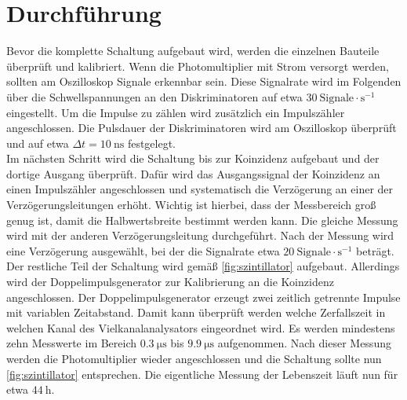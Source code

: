 \section{Durchführung}
\label{sec:Durchführung}

Bevor die komplette Schaltung aufgebaut wird, werden die einzelnen Bauteile überprüft und kalibriert.
Wenn die Photomultiplier mit Strom versorgt werden, sollten am Oszilloskop Signale erkennbar sein.
Diese Signalrate wird im Folgenden über die Schwellspannungen an den Diskriminatoren auf etwa $\qty{30}{\text{Signale}\cdot \second^{-1}}$ eingestellt.
Um die Impulse zu zählen wird zusätzlich ein Impulszähler angeschlossen.
Die Pulsdauer der Diskriminatoren wird am Oszilloskop überprüft und auf etwa $\Delta t = \qty{10}{\nano\second}$ festgelegt.
\\
Im nächsten Schritt wird die Schaltung bis zur Koinzidenz aufgebaut und der dortige Ausgang überprüft.
Dafür wird das Ausgangssignal der Koinzidenz an einen Impulszähler angeschlossen und systematisch die Verzögerung an einer der Verzögerungsleitungen erhöht.
Wichtig ist hierbei, dass der Messbereich groß genug ist, damit die Halbwertsbreite bestimmt werden kann.
Die gleiche Messung wird mit der anderen Verzögerungsleitung durchgeführt.
Nach der Messung wird eine Verzögerung ausgewählt, bei der die Signalrate etwa $\qty{20}{\text{Signale}\cdot \second^{-1}}$ beträgt.
\\
Der restliche Teil der Schaltung wird gemäß \autoref{fig:szintillator} aufgebaut.
Allerdings wird der Doppelimpulsgenerator zur Kalibrierung an die Koinzidenz angeschlossen.
Der Doppelimpulsgenerator erzeugt zwei zeitlich getrennte Impulse mit variablen Zeitabstand.
Damit kann überprüft werden welche Zerfallszeit in welchen Kanal des Vielkanalanalysators eingeordnet wird.
Es werden mindestens zehn Messwerte im Bereich $\qty{0.3}{\micro\second}$ bis $\qty{9.9}{\micro\second}$ aufgenommen.
Nach dieser Messung werden die Photomultiplier wieder angeschlossen und die Schaltung sollte nun \autoref{fig:szintillator} entsprechen.
Die eigentliche Messung der Lebenszeit läuft nun für etwa $\qty{44}{\hour}$.